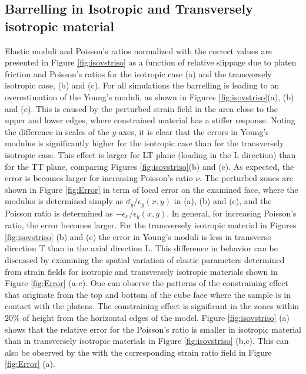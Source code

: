 \documentclass[3p]{elsarticle}
\begin{document}
\subsection{ Barrelling in Isotropic and Transversely isotropic material}


Elastic moduli and Poisson’s ratios normalized with the correct values are presented in Figure \ref{fig:isovstriso} as a function of relative slippage due to platen friction and Poisson’s ratios for the isotropic case (a) and the transversely isotropic case, (b) and (c). 
For all simulations the
barrelling is leading to an overestimation of the Young's moduli, as shown in
Figures \ref{fig:isovstriso}(a), (b) and (c). This is caused by the perturbed
strain field in the area close to the upper and lower edges, where constrained
material has a stiffer response. Noting the difference in scales of the
$y$-axes, it is clear that the errors in Young’s modulus is significantly higher
for the isotropic case than for the transversely isotropic case. This effect is
larger for LT plane (loading in the L direction) than for the TT plane,
comparing Figures \ref{fig:isovstriso}(b) and (c). As expected, the error is
becomes larger for increasing Poisson’s ratio $\nu$. The perturbed zones are
shown in Figure \ref{fig:Error} in term of local error on the examined face,
where the modulus is determined simply as
$\bar{\sigma_y}/{\epsilon_y(x,y)}$ in (a), (b) and (c), and the
Poisson ratio is determined as $-\epsilon_x/{\epsilon_y(x,y)}$.
In general, for increasing Poisson's ratio, the error becomes larger. 
For the transversely isotropic material in Figures
\ref{fig:isovstriso} (b) and (c) the error in Young's moduli is less in
transverse direction T than in the axial direction L.
This difference in behavior can be discussed by examining the spatial variation of elastic parameters determined from strain fields for isotropic and 
transversely isotropic materials shown in Figure 
\ref{fig:Error} (a-c). One can
observe the patterns of the constraining effect that originate from the top
and bottom of the cube face where the sample is in contact with the platens. The constraining effect is significant in the zones within $20\%$ of height
from the horizontal edges of the model. 
Figure \ref{fig:isovstriso} (a\textprime) shows that the relative error for the
Poisson's ratio is smaller in isotropic material than in transversely isotropic
materials in Figure \ref{fig:isovstriso} (b\textprime,c\textprime). This can also be observed
by the with the corresponding strain ratio field in Figure \ref{fig:Error} (a\textprime).
\end{document}
